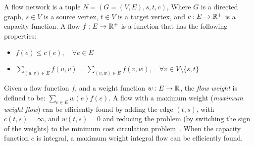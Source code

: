 \label{sec:carpool:preliminary}
A flow network is a tuple $N = (G = (V, E), s, t, c)$, 
Where $G$ is a directed graph, 
$s \in V$ is a source vertex, 
$t \in V$ is a target vertex, 
and $c : E \rightarrow \mathbb{R}^+$ is a capacity function. 
A flow $f : E \rightarrow \mathbb{R}^+$ is a function that has the following properties:
\begin{itemize}
\item
$f(e) \leq c(e), \quad \forall e \in E$

\item
$\sum_{(u, v) \in E} f(u, v) = \sum_{(v, w) \in E} f(v, w), \quad \forall v \in V \setminus \{s, t\}$
\end{itemize}

Given a flow function $f$, 
and a weight function $w: E \rightarrow \mathbb{R}$, 
the \emph{flow weight} is defined to be:
$\sum_{e \in E}{w(e)f(e)}$.
A flow with a maximum weight (\emph{maximum weight flow}) can be efficiently found by adding 
the edge $(t, s)$, with $c(t,s) = \infty$, and $w(t,s) = 0$ and reducing the problem
(by switching the sign of the weights) 
to the minimum cost circulation problem~\cite{tardos1985strongly}.
When the capacity function $c$ is integral, 
a maximum weight integral flow can be efficiently found.  

